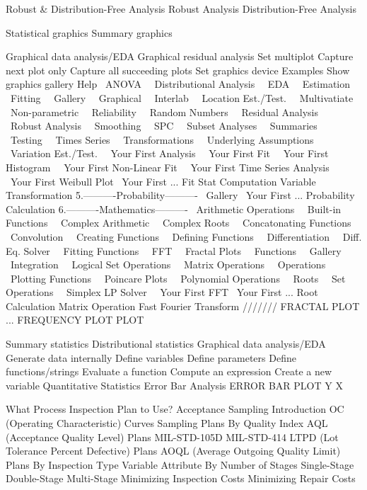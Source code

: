 Robust & Distribution-Free Analysis
   Robust Analysis
   Distribution-Free Analysis
 
Statistical graphics
Summary graphics
 
Graphical data analysis/EDA
Graphical residual analysis
Set multiplot
Capture next plot only
Capture all succeeding plots
Set graphics device
Examples
Show graphics gallery
Help
~ANOVA~
~Distributional Analysis~
~EDA~
~Estimation~
~Fitting~
~Gallery~
~Graphical~
~Interlab~
~Location Est./Test.~
~Multivatiate~
~Non-parametric~
~Reliability~
~Random Numbers~
~Residual Analysis~
~Robust Analysis~
~Smoothing~
~SPC~
~Subset Analyses~
~Summaries~
~Testing~
~Times Series~
~Transformations~
~Underlying Assumptions~
~Variation Est./Test.~
~Your First Analysis~
~Your First Fit~
~Your First Histogram~
~Your First Non-Linear Fit~
~Your First Time Series Analysis~
~Your First Weibull Plot~
Your First ...
Fit
Stat Computation
Variable Transformation
5.----------Probability----------
~Gallery~
Your First ...
Probability Calculation
6.----------Mathematics----------
~Arithmetic Operations~
~Built-in Functions~
~Complex Arithmetic~
~Complex Roots~
~Concatonating Functions~
~Convolution~
~Creating Functions~
~Defining Functions~
~Differentiation~
~Diff. Eq. Solver~
~Fitting Functions~
~FFT~
~Fractal Plots~
~Functions~
~Gallery~
~Integration~
~Logical Set Operations~
~Matrix Operations~
~Operations~
~Plotting Functions~
~Poincare Plots~
~Polynomial Operations~
~Roots~
~Set Operations~
~Simplex LP Solver~
~Your First FFT~
Your First ...
Root Calculation
Matrix Operation
Fast Fourier Transform
///////
FRACTAL PLOT
... FREQUENCY PLOT
PLOT
 
 
Summary statistics
Distributional statistics
Graphical data analysis/EDA
Generate data internally
Define variables
Define parameters
Define functions/strings
Evaluate a function
Compute an expression
Create a new variable
Quantitative Statistics
Error Bar Analysis
ERROR BAR PLOT Y X
 
What Process Inspection Plan to Use?
Acceptance Sampling
   Introduction
   OC (Operating Characteristic) Curves
   Sampling Plans
      By Quality Index
         AQL (Acceptance Quality Level) Plans
            MIL-STD-105D
            MIL-STD-414
         LTPD (Lot Tolerance Percent Defective) Plans
         AOQL (Average Outgoing Quality Limit) Plans
      By Inspection Type
         Variable
         Attribute
      By Number of Stages
         Single-Stage
         Double-Stage
         Multi-Stage
   Minimizing Inspection Costs
   Minimizing Repair Costs
 
